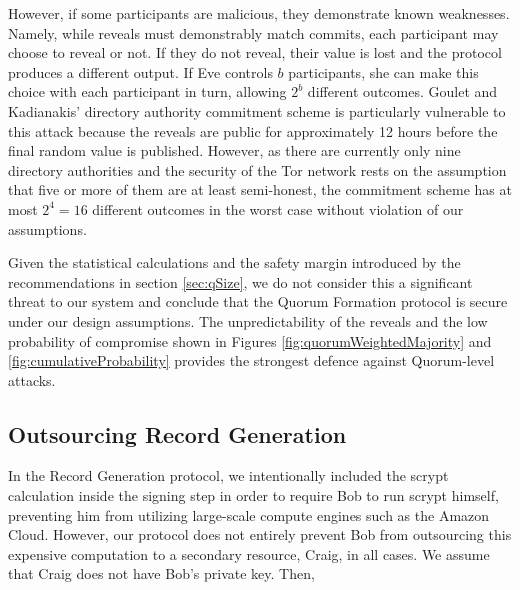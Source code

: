 \documentclass[conference]{IEEEtran}
\begin{document}
However, if some participants are malicious, they demonstrate known weaknesses. Namely, while reveals must demonstrably match commits, each participant may choose to reveal or not. If they do not reveal, their value is lost and the protocol produces a different output. If Eve controls $ b $ participants, she can make this choice with each participant in turn, allowing $ 2^{b} $ different outcomes. Goulet and Kadianakis' directory authority commitment scheme is particularly vulnerable to this attack because the reveals are public for approximately 12 hours before the final random value is published. However, as there are currently only nine directory authorities and the security of the Tor network rests on the assumption that five or more of them are at least semi-honest, the commitment scheme has at most $ 2^{4} = 16 $ different outcomes in the worst case without violation of our assumptions. 

Given the statistical calculations and the safety margin introduced by the recommendations in section \ref{sec:qSize}, we do not consider this a significant threat to our system and conclude that the Quorum Formation protocol is secure under our design assumptions. The unpredictability of the reveals and the low probability of compromise shown in Figures \ref{fig:quorumWeightedMajority} and \ref{fig:cumulativeProbability} provides the strongest defence against Quorum-level attacks.

\subsection{Outsourcing Record Generation}

In the Record Generation protocol, we intentionally included the scrypt calculation inside the signing step in order to require Bob to run scrypt himself, preventing him from utilizing large-scale compute engines such as the Amazon Cloud. However, our protocol does not entirely prevent Bob from outsourcing this expensive computation to a secondary resource, Craig, in all cases. We assume that Craig does not have Bob's private key. Then,
\end{document}
